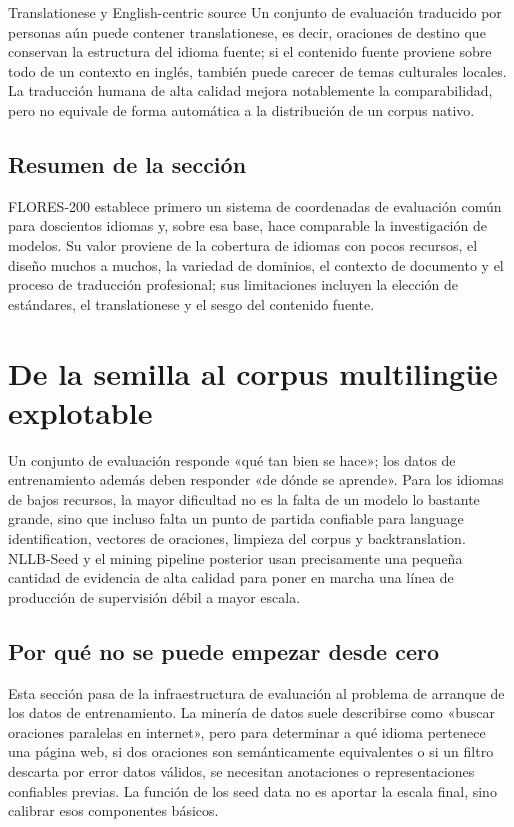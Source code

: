 \documentclass[a4paper]{article}
\begin{document}
\begin{warningbox}{Translationese y English-centric source}
Un conjunto de evaluación traducido por personas aún puede contener translationese, es decir, oraciones de destino que conservan la estructura del idioma fuente; si el contenido fuente proviene sobre todo de un contexto en inglés, también puede carecer de temas culturales locales. La traducción humana de alta calidad mejora notablemente la comparabilidad, pero no equivale de forma automática a la distribución de un corpus nativo.
\end{warningbox}

\subsection{Resumen de la sección}

FLORES-200 establece primero un sistema de coordenadas de evaluación común para doscientos idiomas y, sobre esa base, hace comparable la investigación de modelos. Su valor proviene de la cobertura de idiomas con pocos recursos, el diseño muchos a muchos, la variedad de dominios, el contexto de documento y el proceso de traducción profesional; sus limitaciones incluyen la elección de estándares, el translationese y el sesgo del contenido fuente.
\section{De la semilla al corpus multilingüe explotable}

Un conjunto de evaluación responde «qué tan bien se hace»; los datos de entrenamiento además deben responder «de dónde se aprende». Para los idiomas de bajos recursos, la mayor dificultad no es la falta de un modelo lo bastante grande, sino que incluso falta un punto de partida confiable para language identification, vectores de oraciones, limpieza del corpus y backtranslation. NLLB-Seed y el mining pipeline posterior usan precisamente una pequeña cantidad de evidencia de alta calidad para poner en marcha una línea de producción de supervisión débil a mayor escala.

\subsection{Por qué no se puede empezar desde cero}

Esta sección pasa de la infraestructura de evaluación al problema de arranque de los datos de entrenamiento. La minería de datos suele describirse como «buscar oraciones paralelas en internet», pero para determinar a qué idioma pertenece una página web, si dos oraciones son semánticamente equivalentes o si un filtro descarta por error datos válidos, se necesitan anotaciones o representaciones confiables previas. La función de los seed data no es aportar la escala final, sino calibrar esos componentes básicos.
\end{document}
